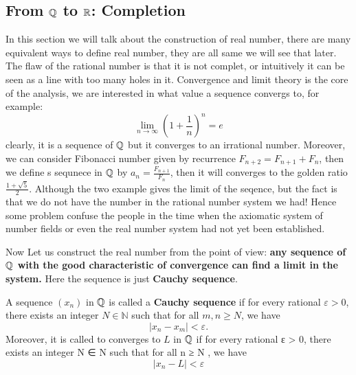 \documentclass[en,geye,blue,normal,12pt]{elegantnote}
\begin{document}
\subsection{From \texorpdfstring{$\mathbb{Q}$}{TEXT} to \texorpdfstring{$\mathbb{R}$}{TEXT}: Completion}
In this section we will talk about the construction of real number, there are many equivalent ways to define real number, they are all same we will see that later. The flaw of the rational number is that it is not complet, or intuitively it can be seen as a line with too many holes in it. Convergence and limit theory is the core of the analysis, we are interested in what value a sequence convergs to, for example:
\[\lim_{n \rightarrow \infty} (1+\frac{1}{n})^n =e\]
clearly, it is a sequence of \(\mathbb{Q}\) but it converges to an irrational number. Moreover, we can consider Fibonacci number given by recurrence \(F_{n+2} = F_{n+1} + F_{n}\), then we define s sequnece in \(\mathbb{Q}\) by \(a_n = \frac{F_{n+1}}{F_n}\), then it will converges to the golden ratio \(\frac{1+\sqrt{5}}{2}\).
Although the two example gives the limit of the seqence, but the fact is that we do not have the number in the rational number system we had! Hence some problem confuse the people in the time when the axiomatic system of number fields or even the real number system had not yet been established. 

Now Let us construct the real number from the point of view: \textbf{any sequence of \(\mathbb{Q}\) with the good characteristic of convergence can find a limit in the system.} Here the sequence is just \textbf{Cauchy sequence}.
\begin{definition}
  A sequence \((x_n)\) in \(\mathbb{\mathbb{Q}}\) is called a \textbf{Cauchy sequence} if for every rational \(\varepsilon > 0\), there exists an integer \(N \in \mathbb{N}\) such that for all \(m, n \geq N\), we have
\[
|x_n - x_m| < \varepsilon.
\]
Moreover, it is called to converges to \(L\) in \(\mathbb{Q}\) if for every rational
ε > 0, there exists an integer N ∈ N such that for all  n ≥ N , we have
\[|x_n-L| < \varepsilon\]
\end{definition}
\end{document}
